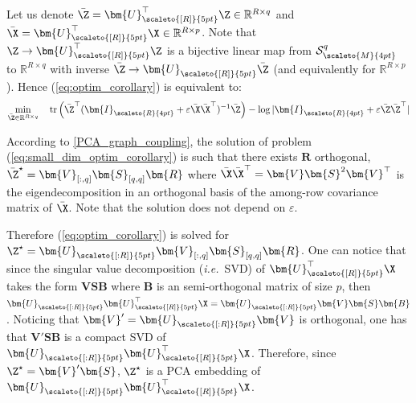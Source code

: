 Let us denote $\bar{\Z} = \bm{U}_{\scaleto{[R]}{5pt}}^\top\Z \in \mathbb{R}^{R \times q}$ and $\bar{\X} = \bm{U}_{\scaleto{[R]}{5pt}}^\top\X \in \mathbb{R}^{R \times p}$. Note that $\Z \to \bm{U}_{\scaleto{[R]}{5pt}}^\top\Z$ is a bijective linear map from $\mathcal{S}^q_{\scaleto{M}{4pt}}$ to $\mathbb{R}^{R \times q}$ with inverse $\bar{\Z} \to \bm{U}_{\scaleto{[R]}{5pt}}\bar{\Z}$ (and equivalently for $\mathbb{R}^{R \times p}$). Hence (\ref{eq:optim_corollary}) is equivalent to:
\begin{align}\label{eq:small_dim_optim_corollary}
    \min_{\bar{\Z} \in \mathbb{R}^{R \times q}} \quad \operatorname{tr}\left(\bar{\Z}^\top(\bm{I}_{\scaleto{R}{4pt}} +  \varepsilon \bar{\X}\bar{\X}^\top)^{-1}\bar{\Z}\right) - \log |\bm{I}_{\scaleto{R}{4pt}}  +  \varepsilon \bar{\Z}\bar{\Z}^\top| 
\end{align}

According to \cref{PCA_graph_coupling}, the solution of problem (\ref{eq:small_dim_optim_corollary}) is such that there exists $\bm{R}$ orthogonal, $\bar{\Z}^\star = \bm{V}_{[:,q]} \bm{S}_{[q,q]} \bm{R}$ where $\bar{\X}\bar{\X}^\top = \bm{V} \bm{S}^2 \bm{V}^\top$ is the eigendecomposition in an orthogonal basis of the among-row covariance matrix of $\bar{\X}$. Note that the solution does not depend on $\varepsilon$.

Therefore (\ref{eq:optim_corollary}) is solved for $\Z^\star = \bm{U}_{\scaleto{[:R]}{5pt}}\bm{V}_{[:,q]} \bm{S}_{[q,q]} \bm{R}$. One can notice that since the singular value decomposition (\textit{i.e.}\ SVD) of $\bm{U}_{\scaleto{[R]}{5pt}}^\top\X$ takes the form $\bm{V}\bm{S}\bm{B}$ where $\bm{B}$ is an semi-orthogonal matrix of size $p$, then $\bm{U}_{\scaleto{[:R]}{5pt}}\bm{U}_{\scaleto{[R]}{5pt}}^\top\X = \bm{U}_{\scaleto{[:R]}{5pt}}\bm{V}\bm{S}\bm{B}$. Noticing that $\bm{V}' = \bm{U}_{\scaleto{[:R]}{5pt}}\bm{V}$ is orthogonal, one has that $\bm{V}' \bm{S}\bm{B}$ is a compact SVD of $\bm{U}_{\scaleto{[:R]}{5pt}}\bm{U}_{\scaleto{[R]}{5pt}}^\top\X$. Therefore, since $\Z^\star = \bm{V}' \bm{S}$, $\Z^\star$ is a PCA embedding of $\bm{U}_{\scaleto{[:R]}{5pt}}\bm{U}_{\scaleto{[R]}{5pt}}^\top\X$.
